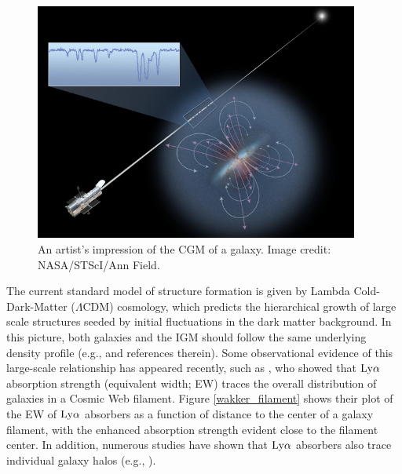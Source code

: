 \begin{figure}[ht!]
        \centering
        \vspace{0pt}
        \includegraphics[width=0.95\textwidth]{Introduction/figures/hubble_cgm.jpg}
        \caption{\small{An artist's impression of the CGM of a galaxy. Image credit: NASA/STScI/Ann Field.}}
        \vspace{5pt}
        \label{cgm_artist}
\end{figure}

The current standard model of structure formation is given by Lambda Cold-Dark-Matter ($\Lambda$CDM) cosmology, which predicts the hierarchical growth of large scale structures seeded by initial fluctuations in the dark matter background. In this picture, both galaxies and the IGM should follow the same underlying density profile (e.g., \citealt{fukugita2006, frieman2008} and references therein). Some observational evidence of this large-scale relationship has appeared recently, such as \cite{wakker2015}, who showed that $\rm Ly\alpha$ absorption strength (equivalent width; EW) traces the overall distribution of galaxies in a Cosmic Web filament. Figure \ref{wakker_filament} shows their plot of the EW of $\rm Ly\alpha$ absorbers as a function of distance to the center of a galaxy filament, with the enhanced absorption strength evident close to the filament center. In addition, numerous studies have shown that $\rm Ly\alpha$ absorbers also trace individual galaxy halos (e.g., \citealt{lanzetta1995, chen1998, chen2001a,  tripp1998, bowen2002, cote2005, wakker2009, steidel2010, prochaska2011b, thom2012, stocke2013, tumlinson2013, liang2014, danforth2016}). 


